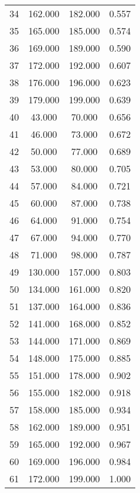 \begin{tabular}{cccc}
  34 & 162.000 & 182.000 & 0.557 \\ 
  35 & 165.000 & 185.000 & 0.574 \\ 
  36 & 169.000 & 189.000 & 0.590 \\ 
  37 & 172.000 & 192.000 & 0.607 \\ 
  38 & 176.000 & 196.000 & 0.623 \\ 
  39 & 179.000 & 199.000 & 0.639 \\ 
  40 & 43.000 & 70.000 & 0.656 \\ 
  41 & 46.000 & 73.000 & 0.672 \\ 
  42 & 50.000 & 77.000 & 0.689 \\ 
  43 & 53.000 & 80.000 & 0.705 \\ 
  44 & 57.000 & 84.000 & 0.721 \\ 
  45 & 60.000 & 87.000 & 0.738 \\ 
  46 & 64.000 & 91.000 & 0.754 \\ 
  47 & 67.000 & 94.000 & 0.770 \\ 
  48 & 71.000 & 98.000 & 0.787 \\ 
  49 & 130.000 & 157.000 & 0.803 \\ 
  50 & 134.000 & 161.000 & 0.820 \\ 
  51 & 137.000 & 164.000 & 0.836 \\ 
  52 & 141.000 & 168.000 & 0.852 \\ 
  53 & 144.000 & 171.000 & 0.869 \\ 
  54 & 148.000 & 175.000 & 0.885 \\ 
  55 & 151.000 & 178.000 & 0.902 \\ 
  56 & 155.000 & 182.000 & 0.918 \\ 
  57 & 158.000 & 185.000 & 0.934 \\ 
  58 & 162.000 & 189.000 & 0.951 \\ 
  59 & 165.000 & 192.000 & 0.967 \\ 
  60 & 169.000 & 196.000 & 0.984 \\ 
  61 & 172.000 & 199.000 & 1.000 \\ 
   \hline
\end{tabular}
